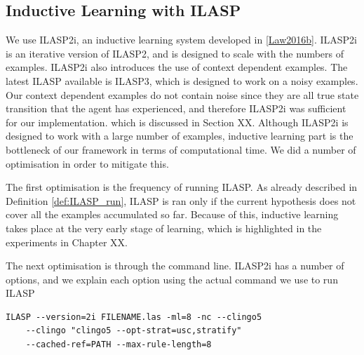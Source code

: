 \subsection{Inductive Learning with ILASP}
We use ILASP2i, an inductive learning system developed in \ref{Law2016b}.
ILASP2i is an iterative version of ILASP2, and is designed to scale with the numbers of examples. 
ILASP2i also introduces the use of context dependent examples.
The latest ILASP available is ILASP3, which is designed to work on a noisy examples. Our context dependent examples do not contain noise since they are all true state transition that the agent has experienced, and therefore ILASP2i was sufficient for our implementation.
which is discussed in Section XX. 
Although ILASP2i is designed to work with a large number of examples, inductive learning part is the bottleneck of our framework in terms of computational time. 
We did a number of optimisation in order to mitigate this. 

The first optimisation is the frequency of running ILASP. 
As already described in Definition \ref{def:ILASP_run}, ILASP is ran only if the current hypothesis does not cover all the examples accumulated so far.
Because of this, inductive learning takes place at the very early stage of learning, which is highlighted in the experiments in Chapter XX. 

The next optimisation is through the command line. 
ILASP2i has a number of options, and we explain each option using the actual command we use to run ILASP


\begin{lstlisting}[]
    ILASP --version=2i FILENAME.las -ml=8 -nc --clingo5 
    --clingo "clingo5 --opt-strat=usc,stratify" 
    --cached-ref=PATH --max-rule-length=8
\end{lstlisting}


